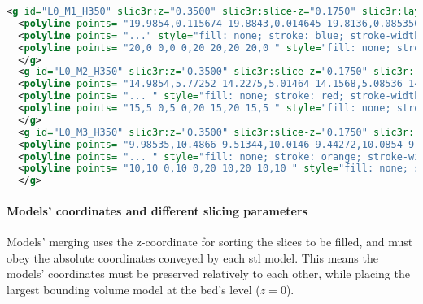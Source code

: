 \begin{lstlisting}[language=xml, basicstyle=\tiny, caption=3cubes.svg (excerpt), label=lst:3cubes]
  <g id="L0_M1_H350" slic3r:z="0.3500" slic3r:slice-z="0.1750" slic3r:layer-height="0.3500" slic3r:mat="1">
  <polyline points= "19.9854,0.115674 19.8843,0.014645 19.8136,0.085356 19.9146,0.186385 19.9854,0.115674 " style="fill: none; stroke: blue; stroke-width: 0.1; fill-type: evenodd" slic3r:type="internal-infill" />
  <polyline points= "..." style="fill: none; stroke: blue; stroke-width: 0.1; fill-type: evenodd" slic3r:type="internal-infill" />
  <polyline points= "20,0 0,0 0,20 20,20 20,0 " style="fill: none; stroke: blue; stroke-width: 0.1; fill-type: evenodd" slic3r:type="" />
  </g>
  <g id="L0_M2_H350" slic3r:z="0.3500" slic3r:slice-z="0.1750" slic3r:layer-height="0.3500" slic3r:mat="2">
  <polyline points= "14.9854,5.77252 14.2275,5.01464 14.1568,5.08536 14.9146,5.84323 14.9854,5.77252 " style="fill: none; stroke: red; stroke-width: 0.1; fill-type: evenodd" slic3r:type="internal-infill" />
  <polyline points= "... " style="fill: none; stroke: red; stroke-width: 0.1; fill-type: evenodd" slic3r:type="internal-infill" />
  <polyline points= "15,5 0,5 0,20 15,20 15,5 " style="fill: none; stroke: red; stroke-width: 0.1; fill-type: evenodd" slic3r:type="" />
  </g>
  <g id="L0_M3_H350" slic3r:z="0.3500" slic3r:slice-z="0.1750" slic3r:layer-height="0.3500" slic3r:mat="3">
  <polyline points= "9.98535,10.4866 9.51344,10.0146 9.44272,10.0854 9.91464,10.5573 9.98535,10.4866 " style="fill: none; stroke: orange; stroke-width: 0.1; fill-type: evenodd" slic3r:type="internal-infill" />
  <polyline points= "... " style="fill: none; stroke: orange; stroke-width: 0.1; fill-type: evenodd" slic3r:type="internal-infill" />
  <polyline points= "10,10 0,10 0,20 10,20 10,10 " style="fill: none; stroke: orange; stroke-width: 0.1; fill-type: evenodd" slic3r:type="" />
  </g>
\end{lstlisting}

\paragraph{Models' coordinates and different slicing parameters}
Models' merging uses the z-coordinate for sorting the slices to be filled, and
must obey the absolute coordinates conveyed by each \gls{stl} model. This
means the models' coordinates must be preserved relatively to each other, while
placing the largest bounding volume model at the bed's level ($z = 0$).

